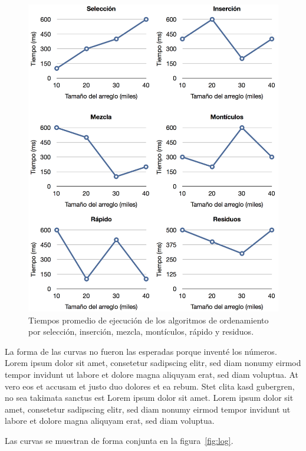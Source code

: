 \documentclass[twocolumn,english,spanish,journal]{IEEEtran}
\begin{document}
\begin{figure}
\begin{centering}
\includegraphics[width=1\textwidth]{lin}
\par\end{centering}

\caption{Tiempos promedio de ejecución de los algoritmos de ordenamiento por
selección, inserción, mezcla, montículos, rápido y residuos.\label{fig:lin}}
\end{figure}

La forma de las curvas no fueron las esperadas porque inventé los
números. Lorem ipsum dolor sit amet, consetetur sadipscing elitr,
sed diam nonumy eirmod tempor invidunt ut labore et dolore magna aliquyam
erat, sed diam voluptua. At vero eos et accusam et justo duo dolores
et ea rebum. Stet clita kasd gubergren, no sea takimata sanctus est
Lorem ipsum dolor sit amet. Lorem ipsum dolor sit amet, consetetur
sadipscing elitr, sed diam nonumy eirmod tempor invidunt ut labore
et dolore magna aliquyam erat, sed diam voluptua.

Las curvas se muestran de forma conjunta en la figura~\ref{fig:log}.
\end{document}
